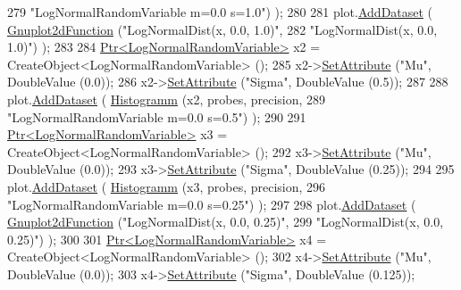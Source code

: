 \begin{DoxyCode}
279                                   \textcolor{stringliteral}{"LogNormalRandomVariable m=0.0 s=1.0"}) );
280 
281     plot.\hyperlink{classns3_1_1Gnuplot_a306ec724a327cf9ab699700f31fca0a1}{AddDataset} ( \hyperlink{classns3_1_1Gnuplot2dFunction}{Gnuplot2dFunction} (\textcolor{stringliteral}{"LogNormalDist(x, 0.0, 1.0)"},
282                                          \textcolor{stringliteral}{"LogNormalDist(x, 0.0, 1.0)"}) );
283 
284     \hyperlink{classns3_1_1Ptr}{Ptr<LogNormalRandomVariable>} x2 = CreateObject<LogNormalRandomVariable> ();
285     x2->\hyperlink{classns3_1_1ObjectBase_ac60245d3ea4123bbc9b1d391f1f6592f}{SetAttribute} (\textcolor{stringliteral}{"Mu"}, DoubleValue (0.0));
286     x2->\hyperlink{classns3_1_1ObjectBase_ac60245d3ea4123bbc9b1d391f1f6592f}{SetAttribute} (\textcolor{stringliteral}{"Sigma"}, DoubleValue (0.5));
287 
288     plot.\hyperlink{classns3_1_1Gnuplot_a306ec724a327cf9ab699700f31fca0a1}{AddDataset} ( \hyperlink{main-random-variable_8cc_a2cfd3837ab3f2e816cf53486d7a186b5}{Histogramm} (x2, probes, precision,
289                                   \textcolor{stringliteral}{"LogNormalRandomVariable m=0.0 s=0.5"}) );
290 
291     \hyperlink{classns3_1_1Ptr}{Ptr<LogNormalRandomVariable>} x3 = CreateObject<LogNormalRandomVariable> ();
292     x3->\hyperlink{classns3_1_1ObjectBase_ac60245d3ea4123bbc9b1d391f1f6592f}{SetAttribute} (\textcolor{stringliteral}{"Mu"}, DoubleValue (0.0));
293     x3->\hyperlink{classns3_1_1ObjectBase_ac60245d3ea4123bbc9b1d391f1f6592f}{SetAttribute} (\textcolor{stringliteral}{"Sigma"}, DoubleValue (0.25));
294 
295     plot.\hyperlink{classns3_1_1Gnuplot_a306ec724a327cf9ab699700f31fca0a1}{AddDataset} ( \hyperlink{main-random-variable_8cc_a2cfd3837ab3f2e816cf53486d7a186b5}{Histogramm} (x3, probes, precision,
296                                   \textcolor{stringliteral}{"LogNormalRandomVariable m=0.0 s=0.25"}) );
297 
298     plot.\hyperlink{classns3_1_1Gnuplot_a306ec724a327cf9ab699700f31fca0a1}{AddDataset} ( \hyperlink{classns3_1_1Gnuplot2dFunction}{Gnuplot2dFunction} (\textcolor{stringliteral}{"LogNormalDist(x, 0.0, 0.25)"},
299                                          \textcolor{stringliteral}{"LogNormalDist(x, 0.0, 0.25)"}) );
300 
301     \hyperlink{classns3_1_1Ptr}{Ptr<LogNormalRandomVariable>} x4 = CreateObject<LogNormalRandomVariable> ();
302     x4->\hyperlink{classns3_1_1ObjectBase_ac60245d3ea4123bbc9b1d391f1f6592f}{SetAttribute} (\textcolor{stringliteral}{"Mu"}, DoubleValue (0.0));
303     x4->\hyperlink{classns3_1_1ObjectBase_ac60245d3ea4123bbc9b1d391f1f6592f}{SetAttribute} (\textcolor{stringliteral}{"Sigma"}, DoubleValue (0.125));

\end{DoxyCode}
